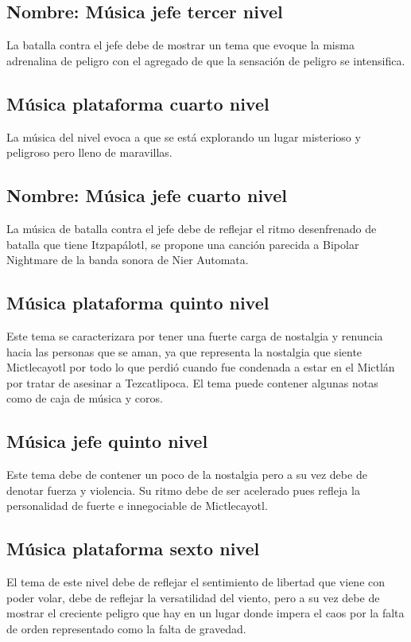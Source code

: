 \subsection{Nombre: Música jefe tercer nivel} \label{Musica:N03_ZN02}
 La batalla contra el jefe debe de mostrar un tema que evoque la misma adrenalina de peligro con el agregado de que la sensación de peligro se intensifica.

\subsection{Música plataforma cuarto nivel}\label{Musica:N04_ZN01}
La música del nivel evoca a que se está explorando un lugar misterioso y peligroso pero lleno de maravillas.
\subsection{Nombre: Música jefe cuarto nivel} \label{Musica:N04_ZN02}
La música de batalla contra el jefe debe de reflejar el ritmo desenfrenado de batalla que tiene Itzpapálotl, se propone una canción parecida a Bipolar Nightmare de la banda sonora de Nier Automata.

\subsection{Música plataforma quinto nivel} \label{Musica:N05_ZN01}
Este tema se caracterizara por tener una fuerte carga de nostalgia y renuncia hacia las personas que se aman, ya que representa la nostalgia que siente Mictlecayotl por todo lo que perdió cuando fue condenada a estar en el Mictlán por tratar de asesinar a Tezcatlipoca. El tema puede contener algunas notas como de caja de música y coros.

\subsection{Música jefe quinto nivel} \label{Musica:N05_ZN02}
Este tema debe de contener un poco de la nostalgia pero a su vez debe de denotar fuerza y violencia. Su ritmo debe de ser acelerado pues refleja la personalidad de fuerte e innegociable de Mictlecayotl. 


\subsection{Música plataforma sexto nivel} \label{Musica:N06_ZN01}
El tema de este nivel debe de reflejar el sentimiento de libertad que viene con poder volar, debe de reflejar la versatilidad del viento, pero a su vez debe de mostrar el creciente peligro que hay en un lugar donde impera el caos por la falta de orden representado como la falta de gravedad. 

